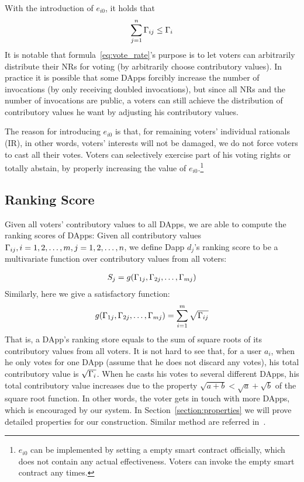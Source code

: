With the introduction of $e_{i0}$, it holds that
$$\sum_{j=1}^n \Gamma_{ij} \leq \Gamma_i$$
\noindent It is notable that formula~\ref{eq:vote_rate}'s purpose is to let voters can arbitrarily distribute their NRs for voting (by arbitrarily choose contributory values). In practice it is possible that some DApps forcibly increase the number of invocations (by only receiving doubled invocations), but since all NRs and the number of invocations are public, a voters can still achieve the distribution of contributory values he want by adjusting his contributory values.

The reason for introducing $e_{i0}$ is that, for remaining voters' individual rationals (IR), in other words, voters' interests will not be damaged, we do not force voters to cast all their votes. Voters can selectively exercise part of his voting rights or totally abstain, by properly increasing the value of $e_{i0}$.\footnote{$e_{i0}$ can be implemented by setting a empty smart contract officially, which does not contain any actual effectiveness. Voters can invoke the empty smart contract any times.}
\subsection{Ranking Score}
Given all voters' contributory values to all DApps, we are able to compute the
ranking scores of DApps: Given all contributory values
$\Gamma_{ij},i=1,2,\ldots,m,j=1,2,\ldots,n$, we define Dapp $d_j$'s ranking score to be a multivariate function over contributory values from all voters:

\begin{align}
	S_j = g(\Gamma_{1j},\Gamma_{2j},\ldots,\Gamma_{mj})
\end{align}
Similarly, here we give a satisfactory function:
\begin{align}
	\label{eq:sqrt}
	g(\Gamma_{1j},\Gamma_{2j},\ldots,\Gamma_{mj}) = \sum_{i=1}^m \sqrt{\Gamma_{ij}}
\end{align}
That is, a DApp's ranking store equals to the sum of square roots of its contributory values from all voters. It is not hard to see that, for a user $a_i$, when he only votes for one DApp (assume that he does not discard any votes), his total contributory value is $\sqrt{\Gamma_i}$. When he casts his votes to several different DApps, his total contributory value increases due to the property $\sqrt{a+b}<\sqrt{a}+\sqrt{b}$ of the square root function. In other words, the voter gets in touch with more DApps, which is encouraged by our system. In Section~\ref{section:properties} we will prove  detailed properties for our construction. Similar method are referred in~\cite{buterin2018liberal}.

